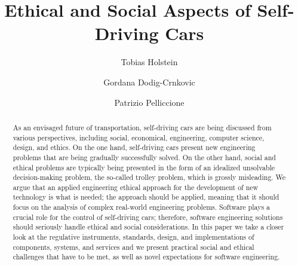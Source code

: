 \documentclass[sigconf,review, anonymous]{acmart}
\begin{document}
\title{Ethical and Social Aspects of Self-Driving Cars}




\author{Tobias Holstein}

\author{Gordana Dodig-Crnkovic}


\author{Patrizio Pelliccione}



\renewcommand{\shortauthors}{T. Holstein et al.}



\begin{acronym}
\end{acronym}





\begin{abstract}
As an envisaged future of transportation, self-driving cars are being discussed from various perspectives, including social, economical, engineering, computer science, design, and ethics. On the one hand, self-driving cars present new engineering problems that are being gradually successfully solved. On the other hand, social and ethical problems are typically being presented in the form of an idealized unsolvable decision-making problem, the so-called trolley problem, which is grossly misleading. We argue that an applied engineering ethical approach for the development of new technology is what is needed; the approach should be applied, meaning that it should focus on the analysis of complex real-world engineering problems. Software plays a crucial role for the control of self-driving cars; therefore, software engineering  solutions should seriously handle ethical and social considerations. 
In this paper we take a closer look at the regulative instruments, standards, design, and implementations of components, systems, and services and we present practical social and ethical challenges that have to be met, as well as novel expectations for software engineering.
\end{abstract}
\end{document}
